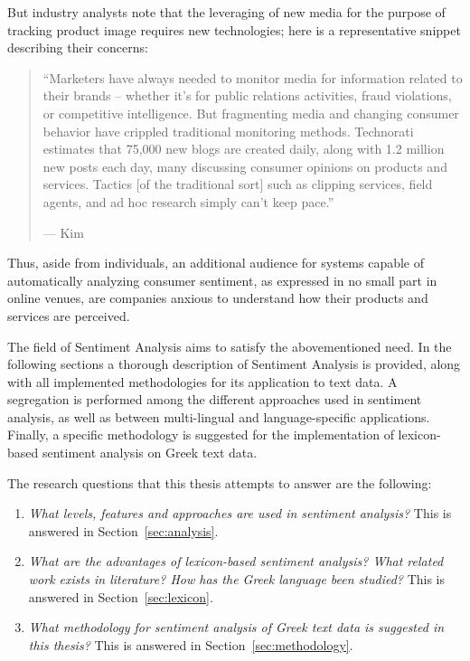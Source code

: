 But industry analysts note that the leveraging of new media for the
purpose of tracking product image requires new technologies; here is a
representative snippet describing their concerns:

\begin{quote}
``Marketers have always needed to monitor media
for information related to their brands --
whether it's for public relations activities,
fraud violations, or competitive intelligence.
But fragmenting media and changing consumer behavior
have crippled traditional monitoring methods.
Technorati estimates that 75,000 new blogs are created daily,
along with 1.2 million new posts each day,
many discussing consumer opinions on products and services.
Tactics [of the traditional sort]
such as clipping services, field agents,
and ad hoc research simply can't keep pace.''

\hfill --- Kim~\cite{Kim06}
\end{quote}

Thus, aside from individuals, an additional audience for systems capable
of automatically analyzing consumer sentiment, as expressed in no
small part in online venues, are companies anxious to understand how
their products and services are perceived.

The field of Sentiment Analysis aims to satisfy the abovementioned need.
In the following sections a thorough description of Sentiment Analysis is provided,
along with all implemented methodologies for its application to text data.
A segregation is performed
among the different approaches used in sentiment analysis,
as well as between multi-lingual and language-specific applications.
Finally, a specific methodology is suggested for the implementation
of lexicon-based sentiment analysis on Greek text data.

The research questions that this thesis attempts to answer are the following:

\begin{enumerate}
 \item \emph{What levels, features and approaches are used in sentiment analysis?}
 This is answered in Section~\ref{sec:analysis}.
 \item \emph{What are the advantages of lexicon-based sentiment analysis?
 What related work exists in literature?
 How has the Greek language been studied?}
 This is answered in Section~\ref{sec:lexicon}.
 \item \emph{What methodology for sentiment analysis of Greek text data is suggested in this thesis?}
 This is answered in Section~\ref{sec:methodology}.
\end{enumerate}
